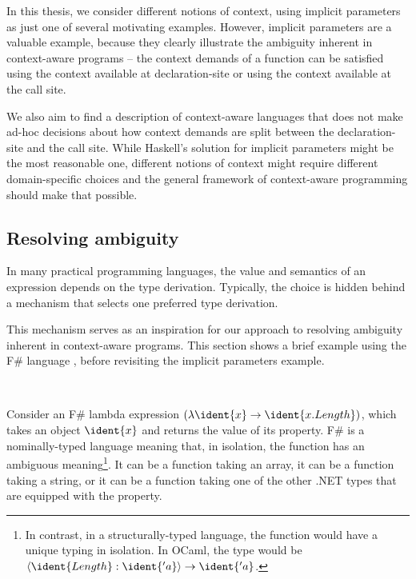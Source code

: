 In this thesis, we consider different notions of context, using implicit parameters as just one
of several motivating examples. However, implicit parameters are a valuable example, because they
clearly illustrate the ambiguity inherent in context-aware programs -- the context demands of
a function can be satisfied using the context available at declaration-site or using the context
available at the call site.

We also aim to find a description of context-aware languages that does not make ad-hoc decisions
about how context demands are split between the declaration-site and the call site. While
Haskell's solution for implicit parameters might be the most reasonable one, different notions
of context might require different domain-specific choices and the general framework of
context-aware programming should make that possible.


\subsection{Resolving ambiguity}
\label{sec:path-binding-amb}

In many practical programming languages, the value and semantics of an expression depends on the
type derivation. Typically, the choice is hidden behind a mechanism that selects one preferred type
derivation.

This mechanism serves as an inspiration for our approach to resolving ambiguity inherent in
context-aware programs. This section shows a brief example using the F\# language \cite{app-fsharp},
before revisiting the implicit parameters example.

~

Consider an F\# lambda expression $(\lambda\ident{x}\rightarrow\ident{x.Length})$, which takes
an object $\ident{x}$ and returns the value of its  property. F\# is a nominally-typed
language meaning that, in isolation, the function has an ambiguous meaning\footnote{In contrast,
in a structurally-typed language, the function would have a unique typing in isolation. In OCaml,
the type would be $\langle \ident{Length}:\ident{'a}\rangle \rightarrow \ident{'a}$.}. It can be
a function taking an array, it can be a function taking a string, or it can be a function taking
one of the other .NET types that are equipped with the  property.

